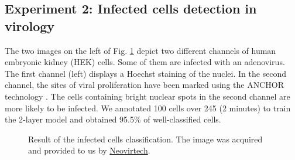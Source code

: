 \documentclass{article}
\begin{document}
\subsection{Experiment 2: Infected cells detection in virology}

The two images on the left of Fig. \ref{fig:infected} depict two different channels of human embryonic kidney (HEK) cells. 
Some of them are infected with an adenovirus. 
The first channel (left) displays a Hoechst staining of the nuclei.
In the second channel, the sites of viral proliferation have been marked using the ANCHOR technology \cite{mariame2018real}.
The cells containing bright nuclear spots in the second channel are more likely to be infected.
We annotated 100 cells over 245 (2 minutes) to train the 2-layer model and obtained 95.5\% of well-classified cells.

\begin{figure}[h!]
  \begin{center}
     \end{center}
\caption{Result of the infected cells classification. The image was acquired and provided to us by \href{https://neovirtech.com/}{Neovirtech}. \label{fig:infected}}
\end{figure}
\end{document}
